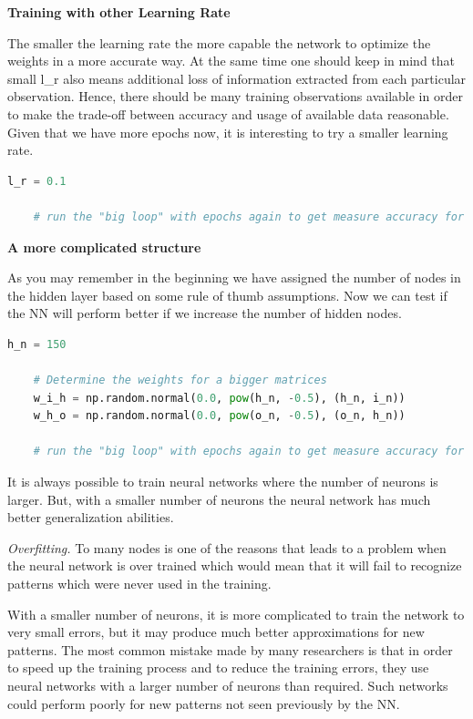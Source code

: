 \textbf{Training with other Learning Rate}
   
The smaller the learning rate the more capable the network to optimize the weights in a more accurate way. At the same time one should keep in mind that small l\_r also means additional loss of information extracted from each particular observation. Hence, there should be many training observations available in order to make the trade-off between accuracy and usage of available data reasonable. Given that we have more epochs now, it is interesting to try a smaller learning rate.

\begin{lstlisting}[language=Python]   
    l_r = 0.1

    # run the "big loop" with epochs again to get measure accuracy for new settings.
\end{lstlisting}

\textbf{A more complicated structure}

As you may remember in the beginning we have assigned the number of nodes in the hidden layer based on some rule of thumb assumptions. Now we can test if the NN will perform better if we increase the number of hidden nodes.

\begin{lstlisting}[language=Python]   
    h_n = 150
    
    # Determine the weights for a bigger matrices
    w_i_h = np.random.normal(0.0, pow(h_n, -0.5), (h_n, i_n))
    w_h_o = np.random.normal(0.0, pow(o_n, -0.5), (o_n, h_n))
    
    # run the "big loop" with epochs again to get measure accuracy for new settings.
\end{lstlisting}

It is always possible to train neural networks where the number of neurons is larger. But, with a smaller number of neurons the neural network has much better generalization abilities. 

\textit{Overfitting.} To many nodes is one of the reasons that leads to a problem when the neural network is over trained which would mean that it will fail to recognize patterns which were never used in the training.

With a smaller number of neurons, it is more complicated to train the network to very small errors, but it may produce much better approximations for new patterns. The most common mistake made by many researchers is that in order to speed up the training process and to reduce the training errors, they use neural networks with a larger number of neurons than required. Such networks could perform poorly for new patterns not seen previously by the NN.

